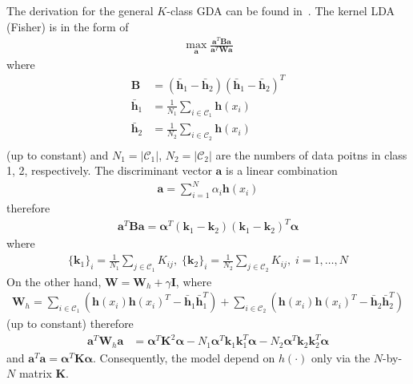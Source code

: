 \begin{exercise}
  The derivation for the general $K$-class GDA can be found
  in~\cite{baudat2000generalized}. The kernel LDA (Fisher) is in the form of
  \begin{align}
    \max_{\mathbf{a}}
    \frac{\mathbf{a}^T\mathbf{B}\mathbf{a}} {\mathbf{a}^T\mathbf{W}\mathbf{a}}
  \end{align}
  where 
  \begin{align}
    \mathbf{B} & = (\bar{\mathbf{h}}_1 - \bar{\mathbf{h}}_2)(\bar{\mathbf{h}}_1
    - \bar{\mathbf{h}}_2)^T \\
    \bar{\mathbf{h}}_1 &= \frac{1}{N_1}\sum_{i\in\mathcal{C}_1}\mathbf{h}(x_i)
    \\
    \bar{\mathbf{h}}_2 &= \frac{1}{N_2}\sum_{i\in\mathcal{C}_2}\mathbf{h}(x_i)
    \\
  \end{align}
  (up to constant) and $N_1 = |\mathcal{C}_1|$, $N_2 = |\mathcal{C}_2|$ are
  the numbers of data poitns in class 1, 2, respectively. The discriminant vector $\mathbf{a}$ is a
  linear combination
  \begin{align}
    \mathbf{a} = \sum_{i = 1}^N \alpha_i\mathbf{h}(x_i)
  \end{align}
  therefore
  \begin{align}
    \mathbf{a}^T\mathbf{B}\mathbf{a} = \bm{\alpha}^T
    (\mathbf{k}_1-\mathbf{k}_2)(\mathbf{k}_1-\mathbf{k}_2)^T\bm{\alpha}
  \end{align}
  where
  \begin{align}
    \{\mathbf{k}_1\}_i = \frac{1}{N_1}\sum_{j\in\mathcal{C}_1}K_{ij}, \;
    \{\mathbf{k}_2\}_i = \frac{1}{N_2}\sum_{j\in\mathcal{C}_2}K_{ij}, \;
    i = 1,\ldots,N
  \end{align}
  On the other hand, $\mathbf{W} = \mathbf{W}_h +\gamma\mathbf{I}$, where
  \begin{align}
    \mathbf{W}_h =\sum_{i\in\mathcal{C}_1}
    \left(\mathbf{h}(x_i)\mathbf{h}(x_i)^T -
    \bar{\mathbf{h}}_1 \bar{\mathbf{h}}_1^T\right) +
    \sum_{i\in\mathcal{C}_2} \left(\mathbf{h}(x_i)\mathbf{h}(x_i)^T -
    \bar{\mathbf{h}}_2 \bar{\mathbf{h}}_2^T\right)
  \end{align}
  (up to constant) therefore
  \begin{align}
    \mathbf{a}^T\mathbf{W}_h\mathbf{a} &= \bm{\alpha}^T
    \mathbf{K}^2\bm{\alpha}-
    N_1\bm{\alpha}^T\mathbf{k}_1\mathbf{k}_1^T\bm{\alpha} - 
    N_2\bm{\alpha}^T\mathbf{k}_2\mathbf{k}_2^T\bm{\alpha}
  \end{align}
  and $\mathbf{a}^T\mathbf{a} = \bm{\alpha}^T \mathbf{K}\bm{\alpha}$.
  Consequently, the model depend on $h(\cdot)$ only via the
  $N$-by-$N$ matrix $\mathbf{K}$.
\end{exercise}

